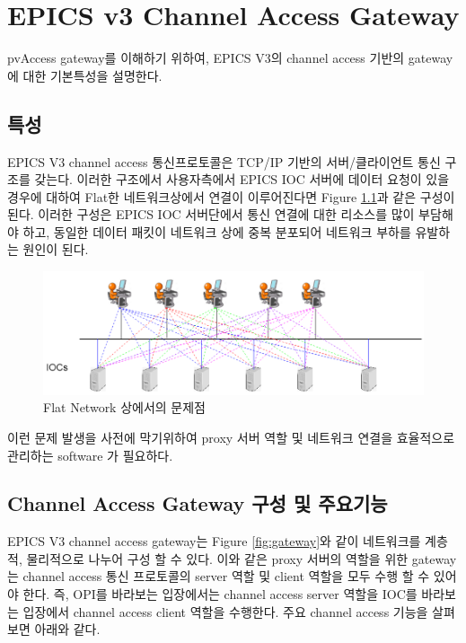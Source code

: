 \documentclass[11pt
  , a4paper
  , article
  , oneside
]{memoir}
\begin{document}
\clearpage

\chapter{EPICS v3 Channel Access Gateway}
pvAccess gateway를 이해하기 위하여, EPICS V3의 channel access 기반의 gateway에 대한 기본특성을 설명한다.

\section{특성}
EPICS V3 channel access 통신프로토콜은 TCP/IP 기반의 서버/클라이언트 통신 구조를 갖는다. 이러한 구조에서 사용자측에서 EPICS IOC 서버에 데이터 요청이 있을 경우에 대하여 Flat한 네트워크상에서 연결이 이루어진다면 Figure \ref{fig:flat_network}과 같은 구성이된다. 이러한 구성은 EPICS IOC 서버단에서 통신 연결에 대한 리소스를 많이 부담해야 하고, 동일한 데이터 패킷이 네트워크 상에 중복 분포되어 네트워크 부하를 유발하는 원인이 된다.
 
\begin{figure}[!htb]
	\centering
	\includegraphics[width=1\textwidth]{./images/flat_network.png}
	\caption{
		Flat Network 상에서의 문제점
	}
	\label{fig:flat_network}   
\end{figure}

이런 문제 발생을 사전에 막기위하여 proxy 서버 역할 및 네트워크 연결을 효율적으로 관리하는 software 가 필요하다. 

\section{Channel Access Gateway 구성 및 주요기능}
EPICS V3 channel access gateway는 Figure \ref{fig:gateway}와 같이 네트워크를 계층적, 물리적으로 나누어 구성 할 수 있다. 이와 같은 proxy 서버의 역할을 위한 gateway는 channel access 통신 프로토콜의 server 역할 및 client 역할을 모두 수행 할 수 있어야 한다. 즉, OPI를 바라보는 입장에서는 channel access server 역할을 IOC를 바라보는 입장에서 channel access client 역할을 수행한다. 주요 channel access 기능을 살펴보면 아래와 같다.
\end{document}
